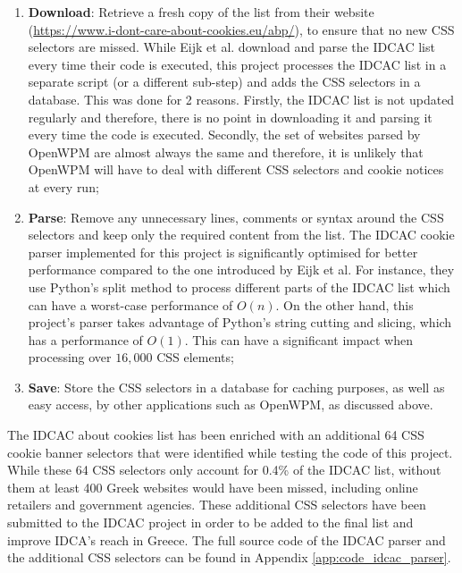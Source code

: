 \documentclass[../main.tex]{subfiles}
\begin{document}
\begin{enumerate}
    \item \textbf{Download}: Retrieve a fresh copy of the  list from their website (\url{https://www.i-dont-care-about-cookies.eu/abp/}), to ensure that no new CSS selectors are missed. While Eijk et al. download and parse the IDCAC list every time their code is executed, this project processes the IDCAC list in a separate script (or a different sub-step) and adds the CSS selectors in a database. This was done for 2 reasons. Firstly, the IDCAC list is not updated regularly and therefore, there is no point in downloading it and parsing it every time the code is executed. Secondly, the set of websites parsed by OpenWPM are almost always the same and therefore, it is unlikely that OpenWPM will have to deal with different CSS selectors and cookie notices at every run;
    
    \item \textbf{Parse}: Remove any unnecessary lines, comments or syntax around the CSS selectors and keep only the required content from the list. The IDCAC cookie parser implemented for this project is significantly optimised for better performance compared to the one introduced by Eijk et al. For instance, they use Python’s split method \cite{python_str_doc} to process different parts of the IDCAC list which can have a worst-case performance of $O(n)$. On the other hand, this project’s parser takes advantage of Python’s string cutting and slicing, which has a performance of $O(1)$. This can have a significant impact when processing over $16,000$ CSS elements;
    
    \item \textbf{Save}: Store the CSS selectors in a database for caching purposes, as well as easy access, by other applications such as OpenWPM, as discussed above.
\end{enumerate}

The IDCAC about cookies list has been enriched with an additional 64 CSS cookie banner selectors that were identified while testing the code of this project. While these 64 CSS selectors only account for 0.4\% of the IDCAC list, without them at least 400 Greek websites would have been missed, including online retailers and government agencies. These additional CSS selectors have been submitted to the IDCAC project in order to be added to the final list and improve IDCA's reach in Greece. The full source code of the IDCAC parser and the additional CSS selectors can be found in Appendix \ref{app:code_idcac_parser}. 
\end{document}
